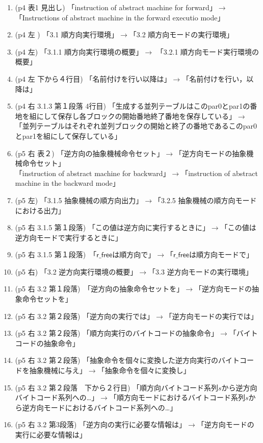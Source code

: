 \documentclass[a4j]{jarticle}
\begin{document}
\begin{enumerate}
\item (p4 表1 見出し) 「instruction of abstract machine for forward」$\rightarrow$「Instructions of abstract machine in the forward executio mode」
\item (p4 左 ) 「3.1 順方向実行環境」$\rightarrow$「3.2 順方向モードの実行環境」
\item (p4 左)  「3.1.1 順方向実行環境の概要」$\rightarrow$ 「3.2.1 順方向モード実行環境の概要」
\item (p4 左 下から４行目) 「名前付けを行い以降は」$\rightarrow$「名前付けを行い，以降は」
\item (p4 右 3.1.3 第１段落 4行目) 「生成する並列テーブルはこのpar0とpar1の番地を組にして保存し各ブロックの開始番地終了番地を保存している」$\rightarrow$「並列テーブルはそれぞれ並列ブロックの開始と終了の番地であるこのpar0とpar1を組にして保存している」
\item (p5 右 表２) 「逆方向の抽象機械命令セット」$\rightarrow$「逆方向モードの抽象機械命令セット」\\
「instruction of abstract machine for backward」$\rightarrow$「instruction of abstract machine in the backward mode」
\item (p5 左) 「3.1.5 抽象機械の順方向出力」$\rightarrow$「3.2.5 抽象機械の順方向モードにおける出力」
\item (p5 右 3.1.5  第１段落) 「この値は逆方向に実行するときに」$\rightarrow$「この値は逆方向モードで実行するときに」
\item (p5 右 3.1.5 第１段落)　「$\mathsf{r\_free}$は順方向で」$\rightarrow$「$\mathsf{r\_free}$は順方向モードで」
\item (p5 右) 「3.2 逆方向実行環境の概要」$\rightarrow$「3.3 逆方向モードの実行環境」
\item (p5 右 3.2 第１段落)　「逆方向の抽象命令セットを」$\rightarrow$「逆方向モードの抽象命令セットを」 
\item (p5 右 3.2 第２段落)   「逆方向の実行では」$\rightarrow$「逆方向モードの実行では」
\item (p5 右 3.2 第２段落)  「順方向実行のバイトコードの抽象命令」$\rightarrow$「バイトコードの抽象命令」
\item (p5 右 3.2 第２段落)   「抽象命令を個々に変換した逆方向実行のバイトコードを抽象機械に与え」$\rightarrow$「抽象命令を個々に変換し」
\item (p5 右 3.2 第２段落　下から２行目) 「順方向バイトコード系列$s$から逆方向バイトコード系列への…」$\rightarrow$「順方向モードにおけるバイトコード系列$s$から逆方向モードにおけるバイトコード系列への…」
\item (p5 右 3.2 第3段落) 「逆方向の実行に必要な情報は」$\rightarrow$「逆方向モードの実行に必要な情報は」

\end{enumerate}
\end{document}

